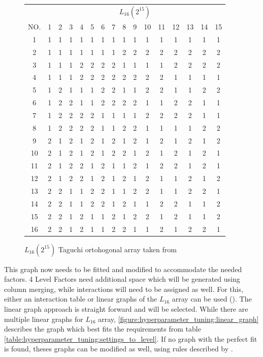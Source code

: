 \begin{figure}[ht]
	\centering
\begin{tabular}{ |c||c|c|c|c|c|c|c|c|c|c|c|c|c|c|c|  }
	\hline
	   & \multicolumn{15}{|c|}{ $L_{16}(2^{15})$ } \\
	NO.& 1 & 2 & 3 & 4 & 5 & 6 & 7 & 8 & 9 & 10& 11& 12& 13& 14&15\\
	\hline
	1  & 1 & 1 & 1 & 1 & 1 & 1 & 1 & 1 & 1 & 1 & 1 & 1 & 1 & 1 & 1\\
	2  & 1 & 1 & 1 & 1 & 1 & 1 & 1 & 2 & 2 & 2 & 2 & 2 & 2 & 2 & 2\\
	3  & 1 & 1 & 1 & 2 & 2 & 2 & 2 & 1 & 1 & 1 & 1 & 2 & 2 & 2 & 2\\
	4  & 1 & 1 & 1 & 2 & 2 & 2 & 2 & 2 & 2 & 2 & 2 & 1 & 1 & 1 & 1\\
	5  & 1 & 2 & 1 & 1 & 1 & 2 & 2 & 1 & 1 & 2 & 2 & 1 & 1 & 2 & 2\\
	6  & 1 & 2 & 2 & 1 & 1 & 2 & 2 & 2 & 2 & 1 & 1 & 2 & 2 & 1 & 1\\
	7  & 1 & 2 & 2 & 2 & 2 & 1 & 1 & 1 & 1 & 2 & 2 & 2 & 2 & 1 & 1\\
	8  & 1 & 2 & 2 & 2 & 2 & 1 & 1 & 2 & 2 & 1 & 1 & 1 & 1 & 2 & 2\\
	9  & 2 & 1 & 2 & 1 & 2 & 1 & 2 & 1 & 2 & 1 & 2 & 1 & 2 & 1 & 2\\
	10 & 2 & 1 & 2 & 1 & 2 & 1 & 2 & 2 & 1 & 2 & 1 & 2 & 1 & 2 & 1\\
	11 & 2 & 1 & 2 & 2 & 1 & 2 & 1 & 1 & 2 & 1 & 2 & 2 & 1 & 2 & 1\\
	12 & 2 & 1 & 2 & 2 & 1 & 2 & 1 & 2 & 1 & 2 & 1 & 1 & 2 & 1 & 2\\
	13 & 2 & 2 & 1 & 1 & 2 & 2 & 1 & 1 & 2 & 2 & 1 & 1 & 2 & 2 & 1\\
	14 & 2 & 2 & 1 & 1 & 2 & 2 & 1 & 2 & 1 & 1 & 2 & 2 & 1 & 1 & 2\\
	15 & 2 & 2 & 1 & 2 & 1 & 1 & 2 & 1 & 2 & 2 & 1 & 2 & 1 & 1 & 2\\
	16 & 2 & 2 & 1 & 2 & 1 & 1 & 2 & 2 & 1 & 1 & 2 & 1 & 2 & 2 & 1\\
	\hline
\end{tabular}
\label{table:hyperparameter_tuning:L16_orhtogonal_array}
\caption{ $L_{16}(2^{15})$ Taguchi ortohogonal array taken from \cite{roy_primer_1990}}
\end{figure}


This graph now needs to be fitted and modified to accommodate the needed factors. 4 Level Factors need additional space which will be generated using column merging, while interactions will need to be assigned as well.
For this, either an interaction table or linear graphs of the $L_{16}$ array can be used (\cite{nazandanacioglu_taguchi_2005}). 
The linear graph approach is straight forward and will be selected. While there are multiple linear graphs for $L_{16}$ array, \ref{figure:hyperparameter_tuning:linear_graph} describes the graph which best fits the requirements from table \ref{table:hyperparameter_tuning:settings_to_level}. If no graph with the perfect fit is found, theses graphs can be modified as well, using rules described by \cite{nazandanacioglu_taguchi_2005}.

